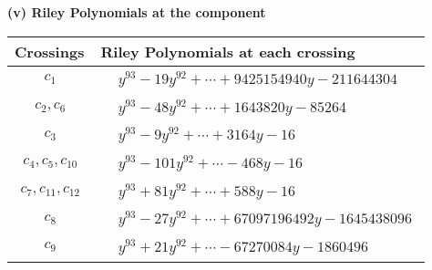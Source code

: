 \documentclass[1p]{elsarticle_modified}
\theoremstyle{definition}
\begin{document}
\flushleft \textbf{(v) Riley Polynomials at the component}\newline \\
\begin{tabular}{m{50pt}|m{274pt}}
Crossings & \hspace{64pt}Riley Polynomials at each crossing \\
\hline $$\begin{aligned}c_{1}\end{aligned}$$&$\begin{aligned}
&y^{93}-19 y^{92}+\cdots+9425154940 y-211644304
\end{aligned}$\\
\hline $$\begin{aligned}c_{2},c_{6}\end{aligned}$$&$\begin{aligned}
&y^{93}-48 y^{92}+\cdots+1643820 y-85264
\end{aligned}$\\
\hline $$\begin{aligned}c_{3}\end{aligned}$$&$\begin{aligned}
&y^{93}-9 y^{92}+\cdots+3164 y-16
\end{aligned}$\\
\hline $$\begin{aligned}c_{4},c_{5},c_{10}\end{aligned}$$&$\begin{aligned}
&y^{93}-101 y^{92}+\cdots-468 y-16
\end{aligned}$\\
\hline $$\begin{aligned}c_{7},c_{11},c_{12}\end{aligned}$$&$\begin{aligned}
&y^{93}+81 y^{92}+\cdots+588 y-16
\end{aligned}$\\
\hline $$\begin{aligned}c_{8}\end{aligned}$$&$\begin{aligned}
&y^{93}-27 y^{92}+\cdots+67097196492 y-1645438096
\end{aligned}$\\
\hline $$\begin{aligned}c_{9}\end{aligned}$$&$\begin{aligned}
&y^{93}+21 y^{92}+\cdots-67270084 y-1860496
\end{aligned}$\\
\hline
\end{tabular}\\~\\
\end{document}
